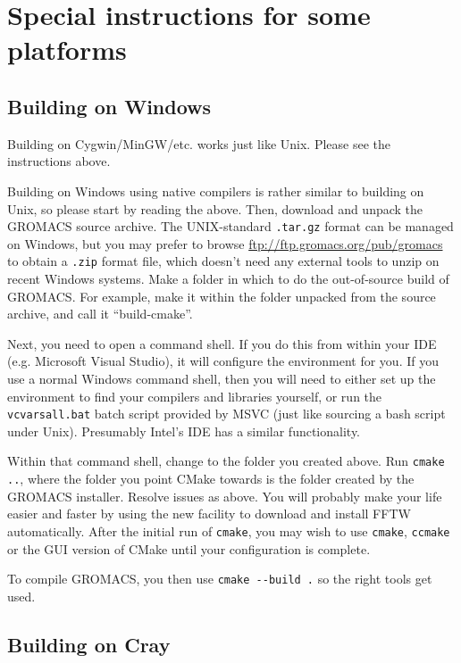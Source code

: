 \documentclass{article}[12pt,a4paper,twoside]
\newcommand{\gromacs}{GROMACS}
\newcommand{\fftw}{FFTW}
\newcommand{\cmake}{CMake}
\begin{document}
\section{Special instructions for some platforms}

\subsection{Building on Windows}

Building on Cygwin/MinGW/etc. works just like Unix. Please see the
instructions above.

Building on Windows using native compilers is rather similar to
building on Unix, so please start by reading the above. Then, download
and unpack the GROMACS source archive. The UNIX-standard
\texttt{.tar.gz} format can be managed on Windows, but you may prefer
to browse \url{ftp://ftp.gromacs.org/pub/gromacs} to obtain a
\texttt{.zip} format file, which doesn't need any external tools to
unzip on recent Windows systems. Make a folder in which to do the
out-of-source build of \gromacs{}. For example, make it within the
folder unpacked from the source archive, and call it ``build-cmake''.

Next, you need to open a command shell. If you do this from within
your IDE (e.g. Microsoft Visual Studio), it will configure the
environment for you. If you use a normal Windows command shell, then
you will need to either set up the environment to find your compilers
and libraries yourself, or run the \texttt{vcvarsall.bat} batch script
provided by MSVC (just like sourcing a bash script under
Unix). Presumably Intel's IDE has a similar functionality.

Within that command shell, change to the folder you created above. Run
\verb+cmake ..+, where the folder you point \cmake{} towards is the
folder created by the \gromacs{} installer. Resolve issues as
above. You will probably make your life easier and faster by using the
new facility to download and install \fftw{} automatically. After the
initial run of \verb+cmake+, you may wish to use \verb+cmake+,
\verb+ccmake+ or the GUI version of \cmake{} until your configuration
is complete.

To compile \gromacs{}, you then use \verb+cmake --build .+ so the
right tools get used.

\subsection{Building on Cray}
\end{document}
